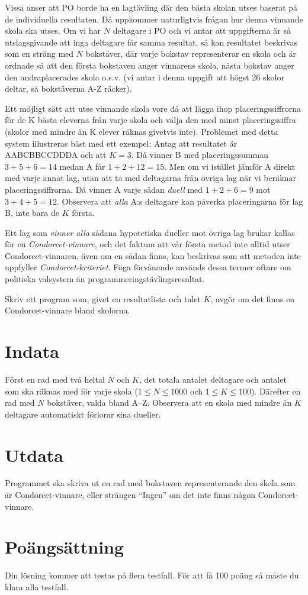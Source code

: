 
Vissa anser att PO borde ha en lagtävling där den bästa skolan utses baserat på de individuella resultaten. Då uppkommer naturligtvis frågan hur denna vinnande skola ska utses.
Om vi har $N$ deltagare i PO och vi antar att uppgifterna är så utslagsgivande att inga deltagare får samma resultat, så kan resultatet beskrivas som en sträng med $N$ bokstäver, där varje bokstav representerar en skola och är ordnade så att den första bokstaven anger vinnarens skola, nästa bokstav anger den andraplacerades skola o.s.v. (vi antar i denna uppgift att högst 26 skolor deltar, så bokstäverna A-Z räcker).

Ett möjligt sätt att utse vinnande skola vore då att lägga ihop placeringssiffrorna för de K bästa eleverna från varje skola och välja den med minst placeringssiffra (skolor med mindre än K elever räknas givetvis inte). Problemet med detta system illustreras bäst med ett exempel: Antag att resultatet är AABCBBCCDDDA
och att $K=3$. Då vinner B med placeringssumman $3+5+6=14$ medan A får $1+2+12=15$. Men om vi istället jämför A direkt med varje annat lag, utan att ta med deltagarna från övriga lag när vi beräknar placeringssiffrorna. Då vinner A varje sådan {\em duell} med $1+2+6=9$ mot $3+4+5=12$. Observera att {\em alla} A:s deltagare kan påverka placeringarna för lag B, inte bara de $K$ första.

Ett lag som {\em vinner alla} sådana hypotetiska dueller mot övriga lag brukar kallas för en {\em Condorcet-vinnare}, och det faktum att vår första metod inte alltid utser Condorcet-vinnaren, även om en sådan finns, kan beskrivas som att metoden inte uppfyller {\em Condorcet-kriteriet}. Föga förvånande används dessa termer oftare om politiska valsystem än programmeringstävlingsresultat.

Skriv ett program som, givet en resultatlista och talet $K$, avgör om det finns en Condorcet-vinnare bland skolorna.

\section*{Indata}

Först en rad med två heltal $N$ och $K$, det totala antalet deltagare och antalet som ska räknas med för varje skola ($1\le N \le 1000$ och $1\le K \le 100$). Därefter en rad med $N$ bokstäver, valda bland A--Z. Observera att en skola med mindre än $K$ deltagare automatiskt förlorar sina dueller.

\section*{Utdata}

Programmet ska skriva ut en rad med bokstaven representerande den skola som är Condorcet-vinnare, eller strängen ``Ingen'' om det inte finns någon Condorcet-vinnare.

\section*{Poängsättning}
Din lösning kommer att testas på flera testfall. För att få 100 poäng så måste du klara alla testfall.
